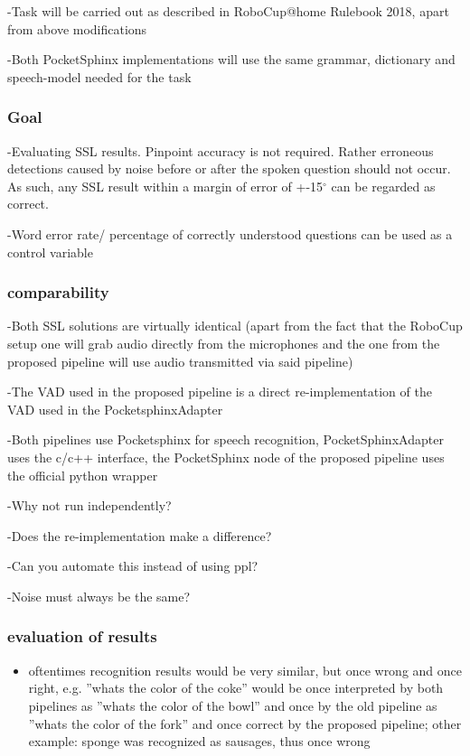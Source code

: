 -Task will be carried out as described in RoboCup@home Rulebook 2018, apart from above modifications

-Both PocketSphinx implementations will use the same grammar, dictionary and speech-model needed for the task

\subsubsection{Goal}
-Evaluating SSL results. Pinpoint accuracy is not required. Rather erroneous detections caused by noise before or after the spoken question should not occur. As such, any SSL result within a margin of error of +-15$^\circ$  can be regarded as correct. 

-Word error rate/ percentage of correctly understood questions can be used as a control variable 

\subsubsection{comparability}
-Both SSL solutions are virtually identical (apart from the fact that the RoboCup setup one will grab audio directly from the microphones and the one from the proposed pipeline will use audio transmitted via said pipeline)

-The VAD used in the proposed pipeline is a direct re-implementation of the VAD used in the PocketsphinxAdapter

-Both pipelines use Pocketsphinx for speech recognition, PocketSphinxAdapter uses the c/c++ interface, the PocketSphinx node of the proposed pipeline uses the official python wrapper

-Why not run independently? 

-Does the re-implementation make a difference?

-Can you automate this instead of using ppl?

-Noise must always be the same?


\subsubsection{evaluation of results}


\begin{itemize}
	\item oftentimes recognition results would be very similar, but once wrong and once right, e.g. ''whats the color of the coke'' would be once interpreted by both pipelines as ''whats the color of the bowl'' and once by the old pipeline as ''whats the color of the fork'' and once correct by the proposed pipeline; other example: sponge was recognized as sausages, thus once wrong
\end{itemize}

